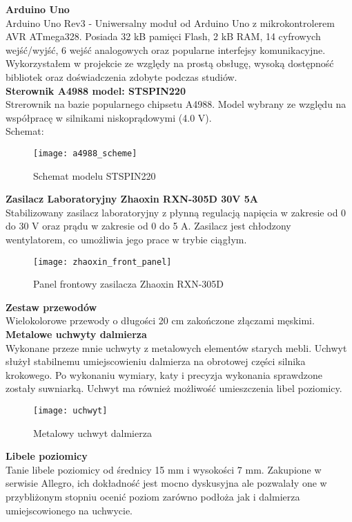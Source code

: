 \textbf{Arduino Uno}\\
Arduino Uno Rev3 - Uniwersalny moduł od Arduino Uno z mikrokontrolerem AVR ATmega328. Posiada 32 kB pamięci Flash, 2 kB RAM, 14 cyfrowych wejść/wyjść, 6 wejść analogowych oraz popularne interfejsy komunikacyjne. Wykorzystałem w projekcie ze względy na prostą obsługę, wysoką dostępność bibliotek oraz doświadczenia zdobyte podczas studiów.\\

\textbf{Sterownik A4988 model: STSPIN220}\\
Strerownik na bazie popularnego chipsetu A4988. Model wybrany ze względu na współpracę w silnikami niskoprądowymi (4.0 V).\\

Schemat:\\
\begin{figure}[h]
    \centering
    \texttt{[image: a4988\_scheme]}
    \caption{Schemat modelu STSPIN220}
    \label{fig:a4988_scheme}
\end{figure}

\textbf{Zasilacz Laboratoryjny Zhaoxin RXN-305D 30V 5A}\\
Stabilizowany zasilacz laboratoryjny z płynną regulacją napięcia w zakresie od 0 do 30 V oraz prądu w zakresie od 0 do 5 A. Zasilacz jest chłodzony wentylatorem, co umożliwia jego prace w trybie ciągłym.
\begin{figure}[h]
    \centering
    \texttt{[image: zhaoxin\_front\_panel]}
    \caption{Panel frontowy zasilacza Zhaoxin RXN-305D}
    \label{fig:zhaoxin_front_panel}
\end{figure}


\textbf{Zestaw przewodów}\\
Wielokolorowe przewody o długości 20 cm zakończone złączami męskimi.\\

\textbf{Metalowe uchwyty dalmierza}\\
Wykonane przeze mnie uchwyty z metalowych elementów starych mebli. Uchwyt służył stabilnemu umiejscowieniu dalmierza na obrotowej części silnika krokowego. Po wykonaniu wymiary, katy i precyzja wykonania sprawdzone zostały suwniarką. Uchwyt ma również możliwość umieszczenia libel poziomicy.
\begin{figure}[h]
    \centering
    \texttt{[image: uchwyt]}
    \caption{Metalowy uchwyt dalmierza}
    \label{fig:uchwyt}
\end{figure}

\textbf{Libele poziomicy}\\
Tanie libele poziomicy od średnicy 15 mm i wysokości 7 mm. Zakupione w serwisie Allegro, ich dokładność jest mocno dyskusyjna ale pozwalały one w przybliżonym stopniu ocenić poziom zarówno podłoża jak i dalmierza umiejscowionego na uchwycie.


